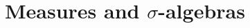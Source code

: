\documentclass[../main.tex]{subfiles}
\begin{document}
\chapter{Measures and $\sigma$-algebras}


\newpage

\end{document}
